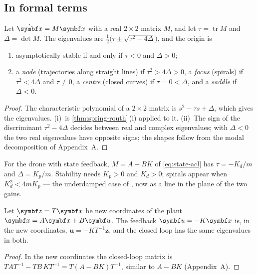 
\subsection{In formal terms}

\begin{theorem}
\label{thm:state-planar}
Let $\dot{\vx} = M\vx$ with a real $2 \times 2$ matrix $M$, and let $\tau = \operatorname{tr}M$ and $\Delta = \det M$. The eigenvalues are $\tfrac12\big(\tau \pm \sqrt{\tau^2 - 4\Delta}\big)$, and the origin is
\begin{enumerate}[label=(\roman*)]
  \item asymptotically stable if and only if $\tau < 0$ and $\Delta > 0$;
  \item a \emph{node} (trajectories along straight lines) if $\tau^2 > 4\Delta > 0$, a \emph{focus} (spirals) if $\tau^2 < 4\Delta$ and $\tau \ne 0$, a \emph{centre} (closed curves) if $\tau = 0 < \Delta$, and a \emph{saddle} if $\Delta < 0$.
\end{enumerate}
\end{theorem}
\begin{proof}
The characteristic polynomial of a $2 \times 2$ matrix is $s^2 - \tau s + \Delta$, which gives the eigenvalues. (i)~is \cref{thm:spring-routh}\,(i) applied to it. (ii)~The sign of the discriminant $\tau^2 - 4\Delta$ decides between real and complex eigenvalues; with $\Delta < 0$ the two real eigenvalues have opposite signs; the shapes follow from the modal decomposition of Appendix~A.
\end{proof}

For the drone with state feedback, $M = A - BK$ of \cref{eq:state-acl} has $\tau = -K_d/m$ and $\Delta = K_p/m$. Stability needs $K_p > 0$ and $K_d > 0$; spirals appear when $K_d^2 < 4mK_p$ — the underdamped case of , now as a line in the plane of the two gains.

\begin{theorem}
\label{thm:state-coord}
Let $\symbf z = T\vx$ be new coordinates of the plant $\dot{\vx} = A\vx + B\symbf u$. The feedback $\symbf u = -K\vx$ is, in the new coordinates, $\symbf u = -KT^{-1}\symbf z$, and the closed loop has the same eigenvalues in both.
\end{theorem}
\begin{proof}
In the new coordinates the closed-loop matrix is $TAT^{-1} - TB\,KT^{-1} = T(A - BK)T^{-1}$, similar to $A - BK$ (Appendix~A).
\end{proof}


